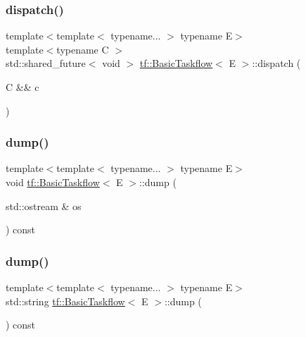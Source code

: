 \subsubsection{\texorpdfstring{dispatch()}{dispatch()}\hspace{0.1cm}{\footnotesize\ttfamily [2/2]}}
{\footnotesize\ttfamily template$<$template$<$ typename... $>$ typename E$>$ \\
template$<$typename C $>$ \\
std\+::shared\+\_\+future$<$ void $>$ \hyperlink{classtf_1_1BasicTaskflow}{tf\+::\+Basic\+Taskflow}$<$ E $>$\+::dispatch (\begin{DoxyParamCaption}\item[{C \&\&}]{c }\end{DoxyParamCaption})}

\mbox{\label{classtf_1_1BasicTaskflow_aec75723fc4f48197bc92748ed8b12d2a}} 
\subsubsection{\texorpdfstring{dump()}{dump()}\hspace{0.1cm}{\footnotesize\ttfamily [1/2]}}
{\footnotesize\ttfamily template$<$template$<$ typename... $>$ typename E$>$ \\
void \hyperlink{classtf_1_1BasicTaskflow}{tf\+::\+Basic\+Taskflow}$<$ E $>$\+::dump (\begin{DoxyParamCaption}\item[{std\+::ostream \&}]{os }\end{DoxyParamCaption}) const}

\mbox{\label{classtf_1_1BasicTaskflow_a913a31040546bcf9d6e044580d170722}} 
\subsubsection{\texorpdfstring{dump()}{dump()}\hspace{0.1cm}{\footnotesize\ttfamily [2/2]}}
{\footnotesize\ttfamily template$<$template$<$ typename... $>$ typename E$>$ \\
std\+::string \hyperlink{classtf_1_1BasicTaskflow}{tf\+::\+Basic\+Taskflow}$<$ E $>$\+::dump (\begin{DoxyParamCaption}{ }\end{DoxyParamCaption}) const}

